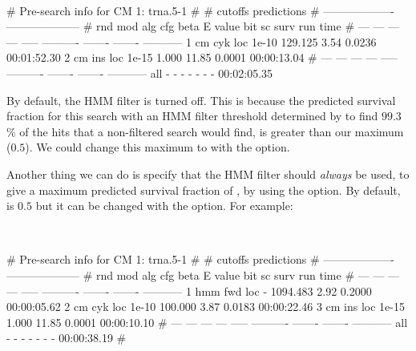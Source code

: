\\

\begin{sreoutput}
# Pre-search info for CM 1: trna.5-1
#
#                                  cutoffs            predictions     
#                            -------------------  --------------------
# rnd  mod  alg  cfg   beta     E value   bit sc     surv     run time
# ---  ---  ---  ---  -----  ----------  -------  -------  -----------
    1   cm  cyk  loc  1e-10     129.125     3.54   0.0236  00:01:52.30
    2   cm  ins  loc  1e-15       1.000    11.85   0.0001  00:00:13.04
# ---  ---  ---  ---  -----  ----------  -------  -------  -----------
  all    -    -    -      -           -        -        -  00:02:05.35
\end{sreoutput}

By default, the HMM filter is turned off. This is because the
predicted survival fraction for this search with an HMM filter
threshold determined by  to find $99.3$\% of the
hits that a non-filtered search would find, is greater than our
maximum ($0.5$). We could change this maximum to  with the 
 option.

Another thing we can do is specify that the HMM filter should
\emph{always} be used, to give a maximum predicted survival fraction
of , by using the  option. By default,
 is $0.5$ but it can be changed with the
 option. For example:

\\

\begin{sreoutput}
# Pre-search info for CM 1: trna.5-1
#
#                                  cutoffs            predictions     
#                            -------------------  --------------------
# rnd  mod  alg  cfg   beta     E value   bit sc     surv     run time
# ---  ---  ---  ---  -----  ----------  -------  -------  -----------
    1  hmm  fwd  loc      -    1094.483     2.92   0.2000  00:00:05.62
    2   cm  cyk  loc  1e-10     100.000     3.87   0.0183  00:00:22.46
    3   cm  ins  loc  1e-15       1.000    11.85   0.0001  00:00:10.10
# ---  ---  ---  ---  -----  ----------  -------  -------  -----------
  all    -    -    -      -           -        -        -  00:00:38.19
#
\end{sreoutput}

